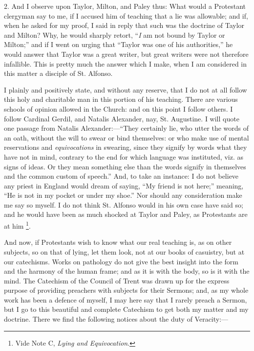 2. And I observe upon Taylor, Milton, and Paley thus: What would a
Protestant clergyman say to me, if I accused him of teaching that a lie
was allowable; and if, when he asked for my proof, I said in reply that such was the doctrine of Taylor and Milton? Why, he
would sharply retort, ``\emph{I} am not bound by Taylor or Milton;''
and if I went on urging that ``Taylor was one of his authorities,''
he would answer that Taylor was a great writer, but great writers were
not therefore infallible. This is pretty much the answer which I make,
when I am considered in this matter a disciple of St. Alfonso.

I plainly and positively state, and without any reserve, that I do
not at all follow this holy and charitable man in this portion of his
teaching. There are various schools of opinion allowed in the Church:
and on this point I follow others. I follow Cardinal Gerdil, and Natalis
Alexander, nay, St. Augustine. I will quote one passage from Natalis
Alexander:—``They certainly lie, who utter the words of an oath,
without the will to swear or bind themselves: or who make use of mental
reservations and \emph{equivocations} in swearing, since they signify by words
what they have not in mind, contrary to the end for which language was
instituted, viz. as signs of ideas. Or they mean something else than the
words signify in themselves and the common custom of speech.'' And,
to take an instance: I do not believe any priest in England would dream
of saying, ``My friend is not here;'' meaning, ``He is not
in my pocket or under my shoe.'' Nor should any consideration make
me say so myself. I do not think St. Alfonso would in his own case have
said so; and he would have been as much shocked at Taylor and
Paley, as Protestants are at him \footnote{Vide Note C, \emph{Lying and Equivocation}.}.

And now, if Protestants wish to know what our real teaching is, as on
other subjects, so on that of lying, let them look, not at our books of
casuistry, but at our catechisms. Works on pathology do not give the
best insight into the form and the harmony of the human frame; and as
it is with the body, so is it with the mind. The Catechism of the
Council of Trent was drawn up for the express purpose of providing
preachers with subjects for their Sermons; and, as my whole
work has been a defence of myself, I may here say that I rarely preach a
Sermon, but I go to this beautiful and complete Catechism to get both my
matter and my doctrine. There we find the following notices about the
duty of Veracity:—

